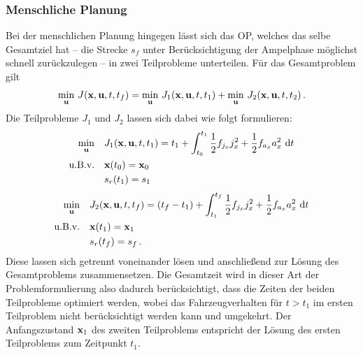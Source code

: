 \subsubsection{Menschliche Planung}\label{subsubsec:Mensch}
Bei der menschlichen Planung hingegen lässt sich das \gls{OP}, welches das selbe Gesamtziel hat -- die Strecke $s_f$ unter Berücksichtigung der Ampelphase möglichst schnell zurückzulegen -- in zwei Teilprobleme unterteilen. Für das Gesamtproblem gilt
\begin{equation}
\min_{\boldsymbol{\mathrm{u}}} \, J(\boldsymbol{\mathrm{x}},\boldsymbol{\mathrm{u}},t,t_f) = \min_{\boldsymbol{\mathrm{u}}} \, J_1(\boldsymbol{\mathrm{x}},\boldsymbol{\mathrm{u}},t,t_1) + \min_{\boldsymbol{\mathrm{u}}} \, J_2(\boldsymbol{\mathrm{x}},\boldsymbol{\mathrm{u}},t,t_2)\,.
\end{equation}
Die Teilprobleme $J_1$ und $J_2$ lassen sich dabei wie folgt formulieren:
	\begin{align}
	\min_{\boldsymbol{\mathrm{u}}} \quad & J_1(\boldsymbol{\mathrm{x}},\boldsymbol{\mathrm{u}},t,t_1) = t_1 + \int_{t_0}^{t_1}\frac{1}{2}f_{j_x} j_x^2 + \frac{1}{2}f_{a_x} a_x^2~\textrm{d}{t} \\
	\textrm{u.B.v.} \quad & \boldsymbol{\mathrm{x}}(t_0) = \boldsymbol{\mathrm{x}}_0 \\
	& s_r(t_1) = s_1 
	\end{align}
	\begin{align}
	\min_{\boldsymbol{\mathrm{u}}} \quad & J_2(\boldsymbol{\mathrm{x}},\boldsymbol{\mathrm{u}},t,t_f) = (t_f - t_1) + \int_{t_1}^{t_f}\frac{1}{2}f_{j_x} j_x^2 + \frac{1}{2}f_{a_x} a_x^2~\textrm{d}{t} \\
	\textrm{u.B.v.} \quad & \boldsymbol{\mathrm{x}}(t_1) = \boldsymbol{\mathrm{x}}_1 \\
	& s_r(t_f) = s_f \,.
	\end{align}
Diese lassen sich getrennt voneinander lösen und anschließend zur Lösung des Gesamtproblems zusammensetzen. Die Gesamtzeit wird in dieser Art der Problemformulierung also dadurch berücksichtigt, dass die Zeiten der beiden Teilprobleme optimiert werden, wobei das Fahrzeugverhalten für $t>t_1$ im ersten Teilproblem nicht berücksichtigt werden kann und umgekehrt. Der Anfangszustand $\boldsymbol{\mathrm{x}}_1$ des zweiten Teilproblems entspricht der Lösung des ersten Teilproblems zum Zeitpunkt $t_1$.

